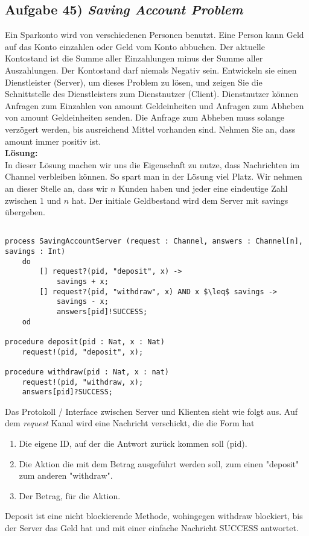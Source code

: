 \documentclass[ngerman,a4paper,11pt]{article}
\begin{document}
\pagebreak

\subsection*{Aufgabe 45) \mdseries\itshape Saving Account Problem}
Ein Sparkonto wird von verschiedenen
Personen benutzt. Eine Person kann Geld auf das Konto einzahlen oder Geld vom Konto abbuchen.
Der aktuelle Kontostand ist die Summe aller Einzahlungen minus der Summe aller
Auszahlungen. Der Kontostand darf niemals Negativ sein.
Entwickeln sie einen Dienstleister (Server), um dieses Problem zu lösen, und zeigen Sie
die Schnittstelle des Dienstleisters zum Dienstnutzer (Client). Dienstnutzer können Anfragen
zum Einzahlen von amount Geldeinheiten und Anfragen zum Abheben von amount Geldeinheiten
senden. Die Anfrage zum Abheben muss solange verzögert werden, bis ausreichend Mittel
vorhanden sind. Nehmen Sie an, dass amount immer positiv ist.\\

\textbf{Lösung:}\\

In dieser Lösung machen wir uns die Eigenschaft zu nutze, dass Nachrichten im Channel verbleiben können. So spart man in der Lösung viel Platz.
Wir nehmen an dieser Stelle an, dass wir $n$ Kunden haben und jeder eine eindeutige Zahl zwischen $1$ und $n$ hat. Der initiale Geldbestand wird
dem Server mit savings übergeben.

\begin{lstlisting}

process SavingAccountServer (request : Channel, answers : Channel[n], savings : Int)
	do
		[] request?(pid, "deposit", x) ->
			savings + x;
		[] request?(pid, "withdraw", x) AND x $\leq$ savings ->
			savings - x;
			answers[pid]!SUCCESS;
	od

procedure deposit(pid : Nat, x : Nat)
	request!(pid, "deposit", x);

procedure withdraw(pid : Nat, x : nat)
	request!(pid, "withdraw, x);
	answers[pid]?SUCCESS;

\end{lstlisting}

Das Protokoll / Interface zwischen Server und Klienten sieht wie folgt aus. Auf dem \emph{request} Kanal wird eine Nachricht verschickt,
die die Form hat
\begin{enumerate}[1:]
	\item Die eigene ID, auf der die Antwort zurück kommen soll (pid).
	\item Die Aktion die mit dem Betrag ausgeführt werden soll, zum einen "deposit" zum anderen "withdraw".
	\item Der Betrag, für die Aktion.
\end{enumerate}

Deposit ist eine nicht blockierende Methode, wohingegen withdraw blockiert, bis der Server das Geld hat und mit einer einfache Nachricht
SUCCESS antwortet.
\end{document}
